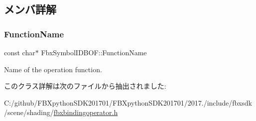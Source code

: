 \subsection{メンバ詳解}
\mbox{\label{class_fbx_symbol_i_d_b_o_f_a7f5ac03e2e8bb5358dff19973afee349}} 
\subsubsection{\texorpdfstring{Function\+Name}{FunctionName}}
{\footnotesize\ttfamily const char$\ast$ Fbx\+Symbol\+I\+D\+B\+O\+F\+::\+Function\+Name\hspace{0.3cm}{\ttfamily [static]}}



Name of the operation function. 



このクラス詳解は次のファイルから抽出されました\+:\begin{DoxyCompactItemize}
\item 
C\+:/github/\+F\+B\+Xpython\+S\+D\+K201701/\+F\+B\+Xpython\+S\+D\+K201701/2017./include/fbxsdk/scene/shading/\hyperlink{fbxbindingoperator_8h}{fbxbindingoperator.\+h}\end{DoxyCompactItemize}
